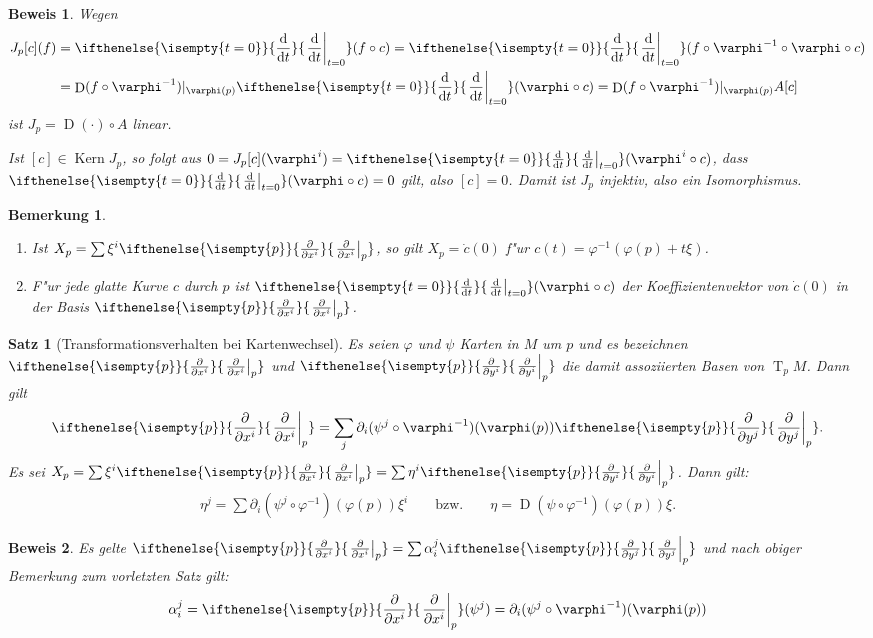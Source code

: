 \documentclass[paper=A4, twoside, chapterprefix=true, bibliography=totoc, headsepline]{scrbook}
\let\temp\phi
\let\phi\varphi
\let\varphi\temp
\let\temp\theta
\let\theta\vartheta
\let\vartheta\temp
\let\temp\epsilon
\let\epsilon\varepsilon
\let\varepsilon\temp
\let\temp\rho
\let\rho\varrho
\let\varrho\temp
\DeclareMathOperator{\D}{D} %
\DeclareMathOperator{\Kern}{Kern}
\DeclareMathOperator{\T}{T} %
\newcommand{\dop}{\mathrm{d}}
\newcommand{\difffrac}[3][]{\ifthenelse{\isempty{#1}}{\frac{\dop #2}{\dop #3}}{\left. \frac{\dop #2}{\dop #3} \right|_{#1}}}
\newcommand{\pdifffrac}[3][]{\ifthenelse{\isempty{#1}}{\frac{\partial #2}{\partial #3}}{\left. \frac{\partial #2}{\partial #3} \right|_{#1}}}
\theoremstyle{plain}
\newtheorem{Satz}[Dfn]{Satz}
\theoremstyle{nonumberplain}
\newtheorem{bem}{Bemerkung}
\newtheorem{bew}{Beweis}
\theoremstyle{empty}
\theoremstyle{break}
\begin{document}
\begin{bew}
  Wegen
  \begin{align*}
    J_p[c](f)& = \difffrac[t=0]{}{t}(f\circ c) = \difffrac[t=0]{}{t}(f \circ \phi^{-1} \circ \phi \circ c)\\
    &  = \D(f \circ \phi^{-1})|_{\phi(p)} \difffrac[t=0]{}{t} (\phi \circ c) = \D (f\circ \phi^{-1})|_{\phi(p)}A[c]
  \end{align*}
  ist $J_p = \D(\cdot)\circ A$ linear.

  Ist $[c] \in \Kern J_p$, so folgt aus $0 = J_p[c](\phi^i) = \difffrac[t=0]{}{t}(\phi^i \circ c)$, dass $\difffrac[t=0]{}{t}(\phi \circ c) = 0$ gilt, also $[c] = 0$. Damit ist $J_p$ injektiv, also ein Isomorphismus.
\end{bew}

\begin{bem}
  \begin{enumerate}[label=\arabic*)]
  \item Ist $X_p = \sum \xi^i\pdifffrac[p]{}{x^i}$, so gilt $X_p = \dot c(0)$ f"ur $c(t) = \phi^{-1}(\phi(p) + t\xi)$.
\item F"ur jede glatte Kurve $c$ durch $p$ ist $\difffrac[t=0]{}{t}(\phi \circ c)$ der Koeffizientenvektor von $\dot c(0)$ in der Basis $\pdifffrac[p]{}{x^i}$.
  \end{enumerate}
\end{bem}


\begin{Satz}[Transformationsverhalten bei Kartenwechsel]\label{satz-2-10}
  Es seien $\phi$ und $\psi$ Karten in $M$ um $p$ und es bezeichnen $\pdifffrac[p]{}{x^i}$ und $\pdifffrac[p]{}{y^i}$ die damit assoziierten Basen von $\T_pM$. Dann gilt
  \begin{align*}
    \pdifffrac[p]{}{x^i} = \sum_j \partial_i(\psi^j \circ \phi^{-1})(\phi(p)) \pdifffrac[p]{}{y^j}.
  \end{align*}
Es sei $X_p = \sum \xi^i \pdifffrac[p]{}{x^i} = \sum \eta^i\pdifffrac[p]{}{y^i}$. Dann gilt:
\begin{align*}
  \eta^j = \sum \partial_i(\psi^j \circ \phi^{-1})(\phi(p))\xi^i && \text{ bzw. } &&
  \eta = \D(\psi \circ \phi^{-1})(\phi(p))\xi.
\end{align*}
\end{Satz}

\begin{bew}
  Es gelte $\pdifffrac[p]{}{x^i} = \sum \alpha_i^j\pdifffrac[p]{}{y^j}$ und nach obiger Bemerkung zum vorletzten Satz gilt:
  \begin{align*}
    \alpha_i^j = \pdifffrac[p]{}{x^i}(\psi^j) = \partial_i(\psi^j \circ \phi^{-1})(\phi(p))
  \end{align*}
\end{bew}
\end{document}
